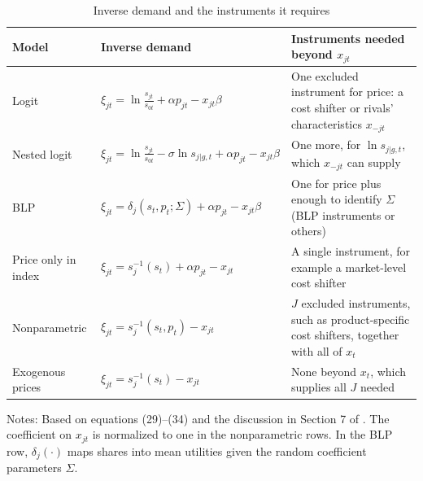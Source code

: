 \begin{table}[htbp]
\centering
\caption{Inverse demand and the instruments it requires}
\label{tab:08-bh-instruments}
\begin{threeparttable}
\small
\begin{tabularx}{\textwidth}{@{}l>{\raggedright\arraybackslash}X>{\raggedright\arraybackslash}p{4.4cm}@{}}
\toprule
Model & Inverse demand & Instruments needed beyond $x_{jt}$ \\
\midrule
Logit & $\xi_{jt} = \ln\frac{s_{jt}}{s_{0t}} + \alpha p_{jt} - x_{jt}\beta$ & One excluded instrument for
  price: a cost shifter or rivals' characteristics $x_{-jt}$ \\[3pt]
Nested logit & $\xi_{jt} = \ln\frac{s_{jt}}{s_{0t}} - \sigma\ln s_{j|g,t} + \alpha p_{jt} - x_{jt}\beta$ &
  One more, for $\ln s_{j|g,t}$, which $x_{-jt}$ can supply \\[3pt]
BLP & $\xi_{jt} = \delta_j(s_t, p_t;\Sigma) + \alpha p_{jt} - x_{jt}\beta$ & One for price plus enough to
  identify $\Sigma$ (BLP instruments or others) \\[3pt]
Price only in index & $\xi_{jt} = s_j^{-1}(s_t) + \alpha p_{jt} - x_{jt}$ & A single instrument, for example a
  market-level cost shifter \\[3pt]
Nonparametric & $\xi_{jt} = s_j^{-1}(s_t, p_t) - x_{jt}$ & $J$ excluded instruments, such as product-specific
  cost shifters, together with all of $x_t$ \\[3pt]
Exogenous prices & $\xi_{jt} = s_j^{-1}(s_t) - x_{jt}$ & None beyond $x_t$, which supplies all $J$ needed \\
\bottomrule
\end{tabularx}
\begin{tablenotes}\footnotesize
\item Notes: Based on equations (29)--(34) and the discussion in Section 7 of \citet{BerryHaile2014}. The
coefficient on $x_{jt}$ is normalized to one in the nonparametric rows. In the BLP row, $\delta_j(\cdot)$ maps
shares into mean utilities given the random coefficient parameters $\Sigma$.
\end{tablenotes}
\end{threeparttable}
\end{table}

